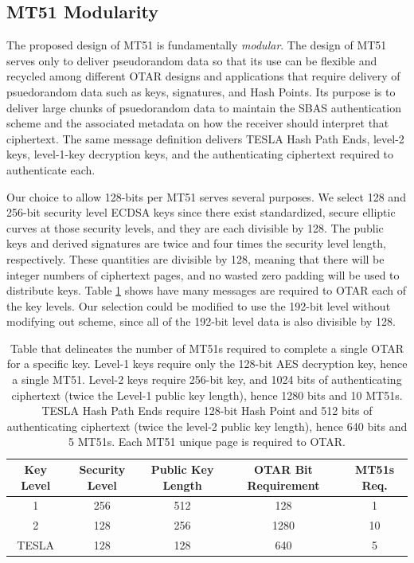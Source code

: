 \documentclass[letterpaper,times]{IONconf/IONconf}
\begin{document}
\subsection{MT51 Modularity} \label{sec: MT51 modularity}

The proposed design of MT51 is fundamentally {\em modular}.
The design of MT51 serves only to deliver pseudorandom data so that its use can be flexible and recycled among different OTAR designs and applications that require delivery of psuedorandom data such as keys, signatures, and Hash Points. 
Its purpose is to deliver large chunks of psuedorandom data to maintain the SBAS authentication scheme and the associated metadata on how the receiver should interpret that ciphertext.
The same message definition delivers TESLA Hash Path Ends, level-2 keys, level-1-key decryption keys, and the authenticating ciphertext required to authenticate each.

Our choice to allow 128-bits per MT51 serves several purposes.
We select 128 and 256-bit security level ECDSA keys since there exist standardized, secure elliptic curves at those security levels, and they are each divisible by 128.
The public keys and derived signatures are twice and four times the security level length, respectively.
These quantities are divisible by 128, meaning that there will be integer numbers of ciphertext pages, and no wasted zero padding will be used to distribute keys.
Table \ref{tab: ciphertext lengths} shows have many messages are required to OTAR each of the key levels.
Our selection could be modified to use the 192-bit level without modifying out scheme, since all of the 192-bit level data is also divisible by 128.
\begin{table}[H]
\center
\begin{tabular}{|c|c|c|c|c|} \hline
	Key Level & Security Level & Public Key Length & OTAR Bit Requirement & MT51s Req. \\ \hline
	    1 & 256 & 512 &  128 & 1 \\ \hline
	    2 & 128 & 256 & 1280 & 10\\ \hline
	TESLA & 128 & 128 &  640 & 5 \\ \hline
\end{tabular}
\caption{Table that delineates the number of MT51s required to complete a single OTAR for a specific key. Level-1 keys require only the 128-bit AES decryption key, hence a single MT51. Level-2 keys require 256-bit key, and 1024 bits of authenticating ciphertext (twice the Level-1 public key length), hence 1280 bits and 10 MT51s. TESLA Hash Path Ends require 128-bit Hash Point and 512 bits of authenticating ciphertext (twice the level-2 public key length), hence 640 bits and 5 MT51s. Each MT51 unique page is required to OTAR.}
\label{tab: ciphertext lengths}
\end{table}
\end{document}
